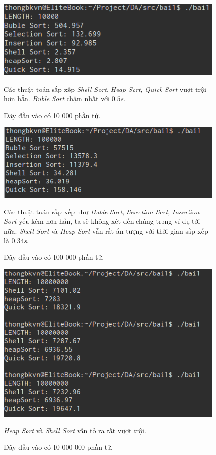 \documentclass[8pt, a4paper]{article}
\begin{document}
\begin{figure}[htp]
\begin{center}
\includegraphics[scale=0.50]{img/bai1_10000.png}
\caption{Dãy đầu vào có 10 000 phần tử.}
\label{}
\end{center}
Các thuật toán sắp xếp \emph{Shell Sort}, \emph{Heap Sort}, \emph{Quick Sort} vượt trội hơn hẳn. \emph{Buble Sort} chậm nhất với $0.5s$.
\end{figure}

\begin{figure}[htp]
\begin{center}
\includegraphics[scale=0.50]{img/bai1_100000.png}
\caption{Dãy đầu vào có 100 000 phần tử.}
\label{}
\end{center}
Các thuật toán sắp xếp như \emph{Buble Sort}, \emph{Selection Sort}, \emph{Insertion Sort} yếu kém hơn hẳn, ta sẽ không xét đến chúng trong ví dụ tới nữa. \emph{Shell Sort} và \emph{Heap Sort} vẫn rất ấn tượng với thời gian sắp xếp là $0.34s$.
\end{figure}

\begin{figure}[htp]
\begin{center}
\includegraphics[scale=0.50]{img/bai1_10000000.png}
\caption{Dãy đầu vào có 10 000 000 phần tử.}
\label{}
\end{center}
\emph{Heap Sort} và \emph{Shell Sort} vẫn tỏ ra rất vượt trội.
\end{figure}
\newpage
\end{document}
